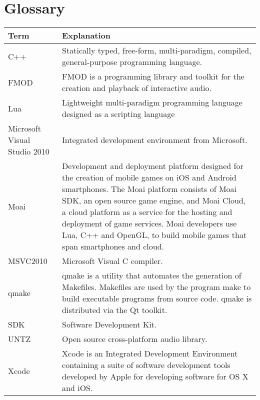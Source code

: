 \chapter{Glossary}

\label{chap:glossary}

\begin{longtable}[!h]{ p{} p{} }
\textbf{Term} & \textbf{Explanation}\\
\hline
\endhead
C++ &  Statically typed, free-form, multi-paradigm, compiled, general-purpose programming language.\\
FMOD & FMOD is a programming library and toolkit for the creation and playback of interactive audio.\\
Lua &  Lightweight multi-paradigm programming language designed as a scripting language\\
Microsoft Visual Studio 2010 &  Integrated development environment  from Microsoft.\\
Moai & Development and deployment platform designed for the creation of mobile games on iOS and Android smartphones. The Moai platform consists of Moai SDK, an open source game engine, and Moai Cloud, a cloud platform as a service for the hosting and deployment of game services. Moai developers use Lua, C++ and OpenGL, to build mobile games that span smartphones and cloud.\\
MSVC2010 & Microsoft Visual C compiler.\\
qmake & qmake is a utility that automates the generation of Makefiles. Makefiles are used by the program make to build executable programs from source code. qmake is distributed via the Qt toolkit.\\
SDK & Software Development Kit.\\
UNTZ & Open source cross-platform audio library.\\
Xcode & Xcode is an Integrated Development Environment containing a suite of software development tools developed by Apple for developing software for OS X and iOS. \\

\end{longtable}
